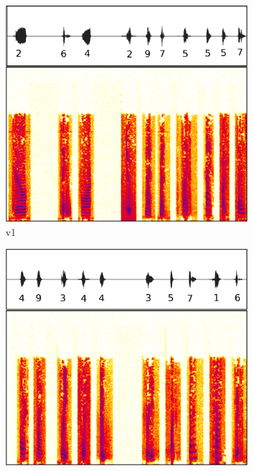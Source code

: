\begin{figure}[tp]
\begin{subfigure}{0.3\textwidth}
        \includegraphics[width=\textwidth]{figures/recaptcha1.pdf}
        \caption{\re v1}
        \label{fig:recaptcha1}
\end{subfigure} \hspace{0.03\textwidth}
\begin{subfigure}{0.3\textwidth}
        \includegraphics[width=\textwidth]{figures/recaptcha2a.pdf}

\end{subfigure}
\end{figure}
